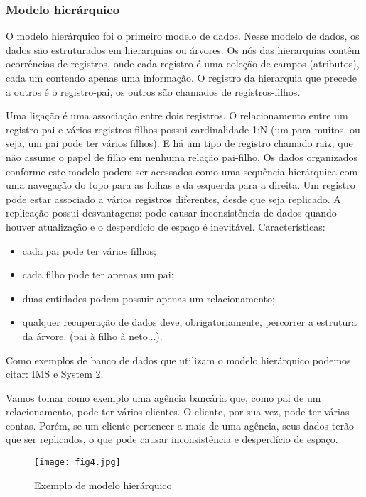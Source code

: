 \documentclass{article}
\begin{document}
\subsubsection{Modelo hierárquico}
O modelo hierárquico foi o primeiro modelo de dados. Nesse modelo de dados, os dados são estruturados em hierarquias ou árvores. Os nós das hierarquias contêm ocorrências de registros, onde cada registro é uma coleção de campos (atributos), cada um contendo apenas uma informação. O registro da hierarquia que precede a outros é o registro-pai, os outros são chamados de registros-filhos.

Uma ligação é uma associação entre dois registros. O relacionamento entre um registro-pai e vários registros-filhos possui cardinalidade 1:N (um para muitos, ou seja, um pai pode ter vários filhos). E há um tipo de registro chamado raiz, que não assume o papel de filho em nenhuma relação pai-filho. Os dados organizados conforme este modelo podem ser acessados como uma sequência hierárquica com uma navegação do topo para as folhas e da esquerda para a direita. Um registro pode estar associado a vários registros diferentes, desde que seja replicado. A replicação possui desvantagens: pode causar inconsistência de dados quando houver atualização e o desperdício de espaço é inevitável. Características:
\begin{itemize}
    \item cada pai pode ter vários filhos;
    \item cada filho pode ter apenas um pai;
    \item duas entidades podem possuir apenas um relacionamento;
    \item qualquer recuperação de dados deve, obrigatoriamente, percorrer a estrutura da árvore. (pai à filho à neto...).
\end{itemize}

Como exemplos de banco de dados que utilizam o modelo hierárquico podemos citar: IMS e System 2.

Vamos tomar como exemplo uma agência bancária que, como pai de um relacionamento, pode ter vários clientes. O cliente, por sua vez, pode ter várias contas. Porém, se um cliente pertencer a mais de uma agência, seus dados terão que ser replicados, o que pode causar inconsistência e desperdício de espaço.

\begin{figure}[h]
    \centering
    \texttt{[image: fig4.jpg]}
    \caption{Exemplo de modelo hierárquico}
    \label{fig:fig4}
\end{figure}
\end{document}
